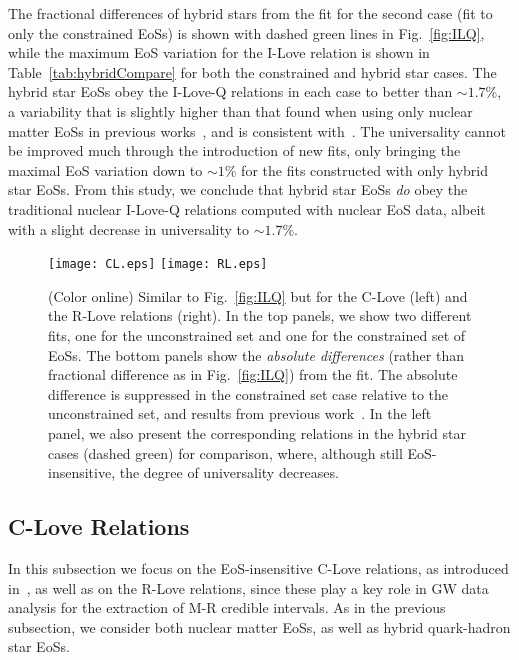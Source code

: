 \documentclass[prd,twocolumn,nofootinbib,superscriptaddress,amsmath,amssymb]{revtex4-1}
\begin{document}
The fractional differences of hybrid stars from the fit for the second case (fit to only the constrained EoSs) is shown with dashed green lines in Fig.~\ref{fig:ILQ}, while the maximum EoS variation for the I-Love relation is shown in Table~\ref{tab:hybridCompare} for both the constrained and hybrid star cases. The hybrid star EoSs obey the I-Love-Q relations in each case to better than $\sim1.7$\%, a variability that is slightly higher than that found when using only nuclear matter EoSs in previous works~\cite{Yagi:2013bca,Yagi:ILQ}, and is consistent with~\cite{Paschalidis2018}. The universality cannot be improved much through the introduction of new fits, only bringing the maximal EoS variation down to $\sim1$\% for the fits constructed with only hybrid star EoSs. From this study, we conclude that hybrid star EoSs \emph{do} obey the traditional nuclear I-Love-Q relations computed with nuclear EoS data, albeit with a slight decrease in universality to $\sim1.7$\%.  


\begin{figure*}
\begin{center} 
\texttt{[image: CL.eps]}
\texttt{[image: RL.eps]}
\end{center}
\caption{
(Color online) Similar to Fig.~\ref{fig:ILQ} but for the C-Love (left) and the R-Love relations (right). In the top panels, we show two different fits, one for the unconstrained set and one for the constrained set of EoSs. The bottom panels show the \emph{absolute differences} (rather than fractional difference as in Fig.~\ref{fig:ILQ}) from the fit. The absolute difference is suppressed in the constrained set case relative to the unconstrained set, and results from previous work~\cite{Maselli:2013mva}. In the left panel, we also present the corresponding relations in the hybrid star cases (dashed green) for comparison, where, although still EoS-insensitive, the degree of universality decreases.
}
\label{fig:clove}
\end{figure*} 

\subsection{C-Love Relations}
\label{sec:clove}

In this subsection we focus on the EoS-insensitive C-Love relations, as introduced in~\cite{Yagi:2013bca,Yagi:ILQ,Maselli:2013mva}, as well as on the R-Love relations, since these play a key role in GW data analysis for the extraction of M-R credible intervals. As in the previous subsection, we consider both nuclear matter EoSs, as well as hybrid quark-hadron star EoSs.
\end{document}
